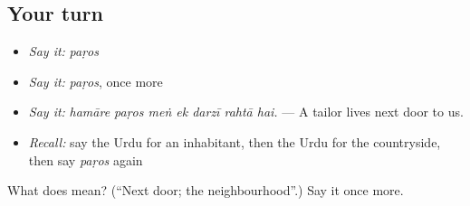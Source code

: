 \subsection*{Your turn}
\begin{itemize}
\raggedright
  \item \emph{Say it:} \emph{paṛos}
  \item \emph{Say it:} \emph{paṛos}, once more
  \item \emph{Say it:} \emph{hamāre paṛos meṅ ek darzī rahtā hai.} — A tailor lives next door to us.
  \item \emph{Recall:} say the Urdu for an inhabitant, then the Urdu for the countryside, then say \emph{paṛos} again
\end{itemize}

\begin{tcolorbox}[breakable,colback=teal!4,colframe=teal!35!black,title={Before you move on}]
What does  mean? (\textquotedblleft{}Next door; the neighbourhood\textquotedblright{}.) Say it once more.
\end{tcolorbox}
